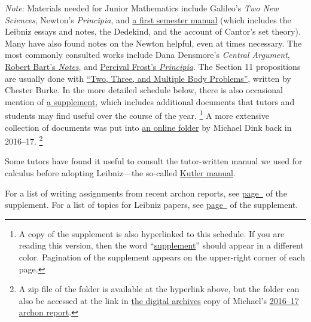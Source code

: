 \documentclass[10pt]{article}
\begin{document}
{\small \emph{Note}: Materials needed for Junior Mathematics 
include Galileo's \emph{Two New Sciences}, Newton's \emph{Principia}, and
\href{https://drive.google.com/file/d/13h-us1vPTZjGNSpHRpInOJR5JjXLNdWb/view?usp=sharing}%
{a first semester manual} (which includes the Leibniz essays and notes,
the Dedekind, and the account of Cantor's set theory).  
Many have also found notes on the Newton helpful, even at times necessary.  
The most commonly consulted works include Dana Densmore's \emph{Central Argument},
\href{https://drive.google.com/file/d/0BwccG5Ei3816aUtwck5GTUVRWkk/view?usp=sharing}{Robert
Bart's \emph{Notes}}, and
\href{https://drive.google.com/file/d/0BwccG5Ei3816cHlRaktYaTJRM0E/view?usp=sharing}%
{Percival Frost's \emph{Principia}}. 
The Section 11 propositions are usually done with
\href{https://drive.google.com/file/d/1c0gRZDPmndb5C2JiWYSOIiMQD-mNR2cD/view?usp=sharing}%
{``Two, Three, and Multiple Body Problems''}, written by Chester Burke.
In the more detailed schedule below, there is also occasional mention of
\href{https://drive.google.com/file/d/1PP99RsI_xEZ8rkgXSOlNBS2Wuk_CJkvN/view?usp=sharing}%
{a supplement}, which includes additional documents
that tutors and students may find useful over the course of the year.%
\footnote{A copy of the supplement is also hyperlinked to this schedule. 
If you are reading this version, then the word ``\hyperref[supple.1]{supplement}''
should appear in a different color. Pagination of the supplement appears on the upper-right
corner of each page.}
A more extensive collection of documents was put into
\href{https://drive.google.com/file/d/1iZOownvFcTZxxFA6KRutjVLpIjE74503/view?usp=sharing}%
{an online folder} by Michael Dink back in 2016--17.%
\footnote{A zip file of the folder is available at the hyperlink above,
but the folder can also be accessed at the link 
in \href{http://digitalarchives.sjc.edu/faculty}{the digital archives} copy
of Michael's \href{https://digitalarchives.sjc.edu/items/show/2677}{2016--17 archon report}.}

Some tutors have found it useful to consult the tutor-written manual we used for calculus before adopting Leibniz---the so-called \href{https://drive.google.com/file/d/15Eaxua300SdHRIPZwpTj6f9-6sOnjunB/view?usp=sharing}{Kutler manual}. 

For a list of writing assignments from recent archon reports, see \hyperref[supple.106]{page~\pageref{supple.106}} of the supplement. For a list of topics for Leibniz papers, see
\hyperref[supple.58]{page~\pageref{supple.58}} of the supplement.

}
\end{document}
